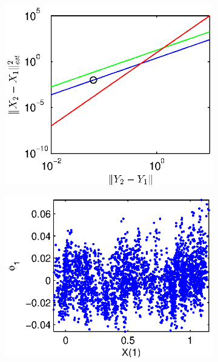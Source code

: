 \documentclass[1p]{elsarticle}
\begin{document}
\begin{figure}
\begin{subfigure}{0.5\textwidth}
\includegraphics[width=\textwidth]{changing_parameters_error_terms_3}
\caption{}
\end{subfigure}
\begin{subfigure}{0.5\textwidth}
\includegraphics[width=\textwidth]{changing_parameters_NIV_corr_3}
\caption{}
\end{subfigure}


\end{figure}
\end{document}
